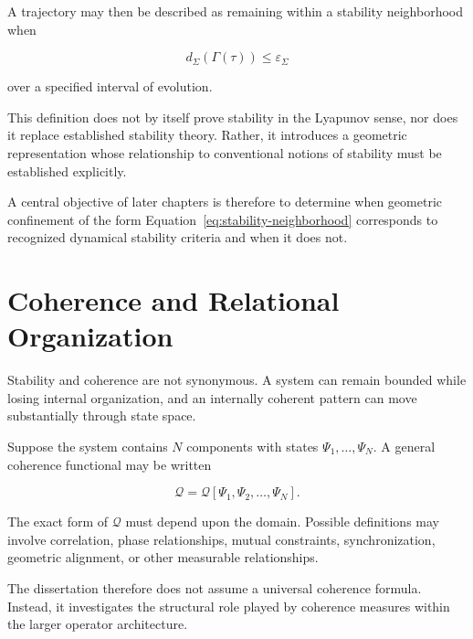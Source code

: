 \documentclass[12pt,oneside]{book}
\newcommand{\Coherence}{\mathcal{Q}}
\begin{document}
A trajectory may then be described as remaining within a
stability neighborhood when

\begin{equation}
    d_{\Sigma}\left(\Gamma(\tau)\right)
    \leq
    \varepsilon_{\Sigma}
    \label{eq:stability-neighborhood}
\end{equation}

over a specified interval of evolution.

This definition does not by itself prove stability in the
Lyapunov sense, nor does it replace established stability
theory. Rather, it introduces a geometric representation whose
relationship to conventional notions of stability must be
established explicitly.

A central objective of later chapters is therefore to determine
when geometric confinement of the form
Equation~\eqref{eq:stability-neighborhood} corresponds to
recognized dynamical stability criteria and when it does not.


\section{Coherence and Relational Organization}
\label{sec:coherence-relational-organization}

Stability and coherence are not synonymous. A system can remain
bounded while losing internal organization, and an internally
coherent pattern can move substantially through state space.

Suppose the system contains \(N\) components with states
\(\Psi_1,\ldots,\Psi_N\). A general coherence functional may be
written

\begin{equation}
    \Coherence
    =
    \Coherence
    \left[
        \Psi_1,
        \Psi_2,
        \ldots,
        \Psi_N
    \right].
    \label{eq:general-coherence-functional}
\end{equation}

The exact form of \(\Coherence\) must depend upon the domain.
Possible definitions may involve correlation, phase
relationships, mutual constraints, synchronization, geometric
alignment, or other measurable relationships.

The dissertation therefore does not assume a universal
coherence formula. Instead, it investigates the structural role
played by coherence measures within the larger operator
architecture.
\end{document}
